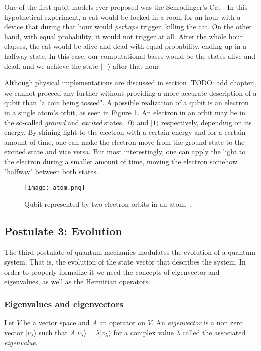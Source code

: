 \documentclass{article}
\begin{document}
	One of the first qubit models ever proposed was the Schrodinger's Cat \cite{Schrodinger1935} \cite{Schrodinger1935a}. In this hypothetical experiment, a cat would be locked in a room for an hour with a device that during that hour would \emph{perhaps} trigger, killing the cat. On the other hand, with equal probability, it would not trigger at all. After the whole hour elapses, the cat would be alive and dead with equal probability, ending up in a halfway state. In this case, our computational bases would be the states alive and dead, and we achieve the state $|+\rangle$ after that hour.
	
	Although physical implementations are discussed in section [TODO: add chapter], we cannot proceed any further without providing a more accurate description of a qubit than "a coin being tossed". A possible realization of a qubit is an electron in a single atom's orbit, as seen in Figure \ref{fig 1.1}. An electron in an orbit may be in the so-called \emph{ground} and \emph{excited} states, $|0\rangle$ and $|1\rangle$ respectively, depending on its energy. By shining light to the electron with a certain energy and for a certain amount of time, one can make the electron move from the ground state to the excited state and vice versa. But most interestingly, one can apply the light to the electron during a smaller amount of time, moving the electron somehow "halfway" between both states.
	
	\begin{figure}[h]
		\texttt{[image: atom.png]}
		\centering
		\caption{Qubit represented by two electron orbits in an atom, \cite{Nielsen2002}.}
		\label{fig 1.1}
	\end{figure}
	
	
	\subsection{Postulate 3: Evolution}
	
	
	The third postulate of quantum mechanics modulates the evolution of a quantum system. That is, the evolution of the state vector that describes the system. In order to properly formalize it we need the concepts of eigenvector and eigenvalues, as well as the Hermitian operators.
	
	
	\subsubsection{Eigenvalues and eigenvectors}
	
	
	\begin{definition}
		Let $V$ be a vector space and $A$ an operator on $V$. An \emph{eigenvector} is a non zero vector $|v_\lambda\rangle$ such that $A|v_\lambda\rangle = \lambda|v_\lambda\rangle$ for a complex value $\lambda$ called the associated \emph{eigenvalue}.
	\end{definition}
	
\end{document}
